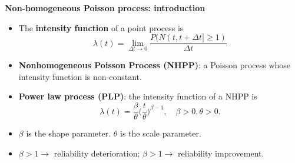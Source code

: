 \documentclass[aspectratio=43]{beamer}
\begin{document}
\begin{frame}{\textbf{Non-homogeneous Poisson process: introduction}}
\begin{itemize}
    \item The \textbf{intensity function} of a point process is $$\lambda(t) = \lim_{\Delta t \rightarrow 0}\frac{P(N(t, t+\Delta t] \geq 1)}{\Delta t}$$
    \item \textbf{Nonhomogeneous Poisson Process (NHPP)}: a Poisson process whose intensity function is non-constant.
    \item \textbf{Power law process (PLP)}: the intensity function of a NHPP is $$\lambda(t) = \frac{\beta}{\theta}\bigg(\frac{t}{\theta}\bigg)^{\beta-1}, \quad \beta > 0, \theta > 0.$$
    \item $\beta$ is the shape parameter.  $\theta$ is the scale parameter.
    \item $\beta > 1 \rightarrow$ reliability deterioration; $\beta > 1 \rightarrow$ reliability improvement.
\end{itemize}
\end{frame}
\end{document}
